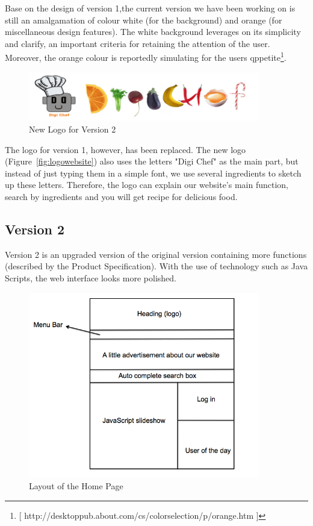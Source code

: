 Base on the design of version 1,the current version we have been working on is still an amalgamation of colour white (for the background) and orange (for miscellaneous design features). The white background leverages on its simplicity and clarify, an important criteria for retaining the attention of the user. Moreover, the orange colour is reportedly simulating for the users qppetite\footnote{[ http://desktoppub.about.com/cs/colorselection/p/orange.htm ]}. 

\begin{figure}[h]
\includegraphics[width=0.9\textwidth]{logowebsite}
\caption{New Logo for Version 2}
\end{figure}

The logo for version 1, however, has been replaced. The new logo (Figure~\ref{fig:logowebsite}) also uses the letters "Digi Chef" as the main part, but instead of just typing them in a simple font, we use several ingredients to sketch up these letters. Therefore, the logo can explain our website's main function, search by ingredients and you will get  recipe for delicious food. 

\subsection{Version 2}

Version 2 is an upgraded version of the original version containing more functions (described by the Product Specification). With the use of technology such as Java Scripts, the web interface looks more polished. 

\begin{figure}[h]
\includegraphics[width=0.9\textwidth]{home_page_v2}
\caption{Layout of the Home Page}
\label{fig:home_page}
\end{figure}

